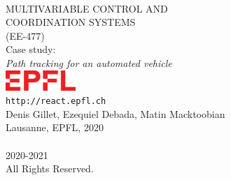 \pagestyle{empty}
{\ \vspace{50px}\\ \centering \huge{MULTIVARIABLE CONTROL AND\\ COORDINATION SYSTEMS\\ (EE-477)}\\}
{\centering \vspace{20px}\large{Case study:\\}\Large{\emph{Path tracking for an automated vehicle}}\\ \vspace{250px}}
%
\large{\centering
\noindent\includegraphics[width = 100px]{./_imags/EPFL-Logo}\\
%
\vspace{20px}
\noindent\texttt{http://react.epfl.ch}\\
%
\vspace{20px}
\noindent Denis Gillet, Ezequiel Debada, Matin Macktoobian\\
%
\noindent Lausanne, EPFL, 2020\\
}\newpage
%
{\centering\ \ \\ \vspace{550px} \raisebox{1px}{\textcopyright} 2020-2021
 \\ 
%
\noindent All Rights Reserved.\\}